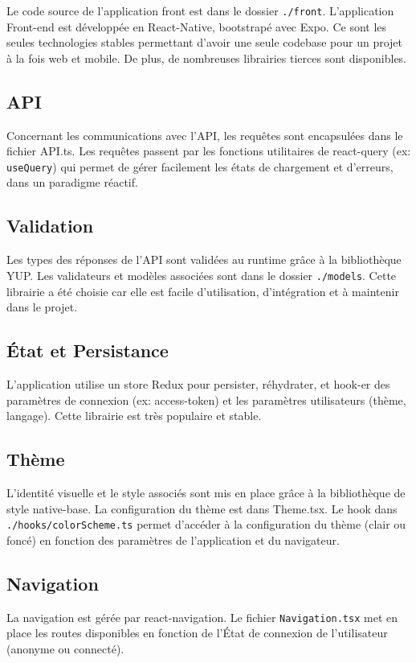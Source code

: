 Le code source de l’application front est dans le  dossier \verb|./front|.
L’application Front-end est développée en React-Native, bootstrapé avec Expo. Ce sont les seules technologies stables permettant d'avoir une seule codebase pour un projet à la fois web et mobile. De plus, de nombreuses librairies tierces sont disponibles.

\subsection*{API}
Concernant les communications avec l’API, les requêtes sont encapsulées dans le fichier API.ts. Les requêtes passent par les fonctions utilitaires de react-query (ex: \verb|useQuery|) qui permet de gérer facilement les états de chargement et d’erreurs, dans un paradigme réactif.

\subsection*{Validation}
Les types des réponses de l’API sont validées au runtime grâce à la bibliothèque YUP. Les validateurs et modèles associées sont dans le dossier \verb|./models|. Cette librairie a été choisie car elle est facile d'utilisation, d'intégration et à maintenir dans le projet.

\subsection*{État et Persistance}
L’application utilise un store Redux pour persister, réhydrater, et hook-er des paramètres de connexion (ex: access-token) et les paramètres utilisateurs (thème, langage). Cette librairie est très populaire et stable. 

\subsection*{Thème}
L’identité visuelle et le style associés sont mis en place grâce à la bibliothèque de style native-base. La configuration du thème est dans Theme.tsx. Le hook dans \verb|./hooks/colorScheme.ts| permet d’accéder à la configuration du thème (clair ou foncé) en fonction des paramètres de l’application et du navigateur.

\subsection*{Navigation}
La navigation est gérée par react-navigation. Le fichier \verb|Navigation.tsx| met en place les routes disponibles en fonction de l’État de connexion de l’utilisateur (anonyme ou connecté).


